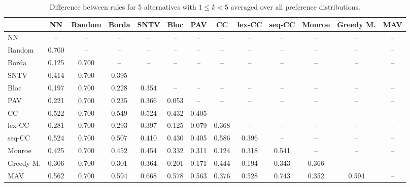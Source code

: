 
\begin{table*}[htbp]
\centering
\begin{tabular}{lcccccccccccc}
\toprule
 & NN & Random & Borda & SNTV & Bloc & PAV & CC & lex-CC & seq-CC & Monroe & Greedy M. & MAV \\
\midrule
NN & -- & -- & -- & -- & -- & -- & -- & -- & -- & -- & -- & -- \\
Random & \cellcolor{blue!70} 0.700 & -- & -- & -- & -- & -- & -- & -- & -- & -- & -- & -- \\
Borda & \cellcolor{blue!12} 0.125 & \cellcolor{blue!70} 0.700 & -- & -- & -- & -- & -- & -- & -- & -- & -- & -- \\
SNTV & \cellcolor{blue!41} 0.414 & \cellcolor{blue!70} 0.700 & \cellcolor{blue!39} 0.395 & -- & -- & -- & -- & -- & -- & -- & -- & -- \\
Bloc & \cellcolor{blue!19} 0.197 & \cellcolor{blue!70} 0.700 & \cellcolor{blue!22} 0.228 & \cellcolor{blue!35} 0.354 & -- & -- & -- & -- & -- & -- & -- & -- \\
PAV & \cellcolor{blue!22} 0.221 & \cellcolor{blue!70} 0.700 & \cellcolor{blue!23} 0.235 & \cellcolor{blue!36} 0.366 & \cellcolor{blue!5} 0.053 & -- & -- & -- & -- & -- & -- & -- \\
CC & \cellcolor{blue!52} 0.522 & \cellcolor{blue!70} 0.700 & \cellcolor{blue!54} 0.549 & \cellcolor{blue!52} 0.524 & \cellcolor{blue!43} 0.432 & \cellcolor{blue!40} 0.405 & -- & -- & -- & -- & -- & -- \\
lex-CC & \cellcolor{blue!28} 0.281 & \cellcolor{blue!70} 0.700 & \cellcolor{blue!29} 0.293 & \cellcolor{blue!39} 0.397 & \cellcolor{blue!12} 0.125 & \cellcolor{blue!7} 0.079 & \cellcolor{blue!36} 0.368 & -- & -- & -- & -- & -- \\
seq-CC & \cellcolor{blue!52} 0.524 & \cellcolor{blue!70} 0.700 & \cellcolor{blue!50} 0.507 & \cellcolor{blue!41} 0.410 & \cellcolor{blue!43} 0.430 & \cellcolor{blue!40} 0.405 & \cellcolor{blue!58} 0.586 & \cellcolor{blue!39} 0.396 & -- & -- & -- & -- \\
Monroe & \cellcolor{blue!42} 0.425 & \cellcolor{blue!70} 0.700 & \cellcolor{blue!45} 0.452 & \cellcolor{blue!45} 0.454 & \cellcolor{blue!33} 0.332 & \cellcolor{blue!31} 0.311 & \cellcolor{blue!12} 0.124 & \cellcolor{blue!31} 0.318 & \cellcolor{blue!54} 0.541 & -- & -- & -- \\
Greedy M. & \cellcolor{blue!30} 0.306 & \cellcolor{blue!70} 0.700 & \cellcolor{blue!30} 0.301 & \cellcolor{blue!36} 0.364 & \cellcolor{blue!20} 0.201 & \cellcolor{blue!17} 0.171 & \cellcolor{blue!44} 0.444 & \cellcolor{blue!19} 0.194 & \cellcolor{blue!34} 0.343 & \cellcolor{blue!36} 0.366 & -- & -- \\
MAV & \cellcolor{blue!56} 0.562 & \cellcolor{blue!70} 0.700 & \cellcolor{blue!59} 0.594 & \cellcolor{blue!66} 0.668 & \cellcolor{blue!57} 0.578 & \cellcolor{blue!56} 0.563 & \cellcolor{blue!37} 0.376 & \cellcolor{blue!52} 0.528 & \cellcolor{blue!74} 0.743 & \cellcolor{blue!35} 0.352 & \cellcolor{blue!59} 0.594 & -- \\
\bottomrule
\end{tabular}

\caption{Difference between rules for 5 alternatives with $1 \leq k < 5$ averaged over all preference distributions.}
\label{tab:rule_distance_heatmap-m=[5]-pref_dist=all}
\end{table*}
    